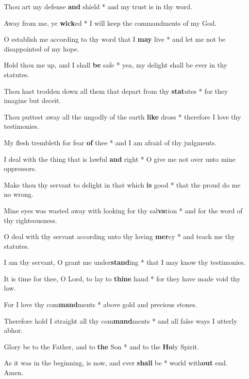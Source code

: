 \begin{multicols}{2}
	Thou art my defense \textbf{and} shield * and my trust is in thy word.
	
	Away from me, ye \textbf{wick}ed * I will keep the commandments of my God.
	
	O establish me according to thy word that I \textbf{may} live * and let me not be disappointed of my hope.
	
	Hold thou me up, and I shall \textbf{be} safe * yea, my delight shall be ever in thy statutes.
	
	Thou hast trodden down all them that depart from thy \textbf{stat}utes * for they imagine but deceit.
	
	Thou puttest away all the ungodly of the earth \textbf{like} dross * therefore I love thy testimonies.
	
	My flesh trembleth for fear \textbf{of} thee * and I am afraid of thy judgments.
	
	I deal with the thing that is lawful \textbf{and} right * O give me not over unto mine oppressors.
	
	Make thou thy servant to delight in that which \textbf{is} good * that the proud do me no wrong.
	
	Mine eyes was wasted away with looking for thy sal\textbf{va}tion * and for the word of thy righteousness.
	
	O deal with thy servant according unto thy loving \textbf{mer}cy * and teach me thy statutes.
	
	I am thy servant, O grant me under\textbf{stand}ing * that I may know thy testimonies.
	
	It is time for thee, O Lord, to lay to \textbf{thine} hand * for they have made void thy law.
	
	For I love thy com\textbf{mand}ments * above gold and precious stones.
	
	Therefore hold I straight all thy com\textbf{mand}ments * and all false ways I utterly abhor. 
	
	Glory be to the Father, and to \textbf{the} Son * and to the \textbf{Ho}ly Spirit.
	
	As it was in the beginning, is now, and ever \textbf{shall} be * world with\textbf{out} end. Amen.
\end{multicols}
